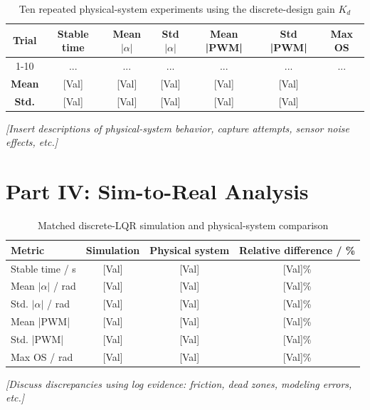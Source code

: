 \documentclass[12pt,a4paper]{article}
\begin{document}
\begin{table}[h!]
    \centering
    \caption{Ten repeated physical-system experiments using the discrete-design gain $K_d$}
    \begin{tabular}{ccccccc}
        \toprule
        \textbf{Trial} & \textbf{Stable time} & \textbf{Mean $|\alpha|$} & \textbf{Std $|\alpha|$} & \textbf{Mean |PWM|} & \textbf{Std |PWM|} & \textbf{Max OS} \\
        \midrule
        1-10 & ... & ... & ... & ... & ... & ... \\
        \midrule
        \textbf{Mean} & [Val] & [Val] & [Val] & [Val] & [Val] & \\
        \textbf{Std.} & [Val] & [Val] & [Val] & [Val] & [Val] & \\
        \bottomrule
    \end{tabular}
\end{table}

\textit{[Insert descriptions of physical-system behavior, capture attempts, sensor noise effects, etc.]}

\section{Part IV: Sim-to-Real Analysis}

\begin{table}[h!]
    \centering
    \caption{Matched discrete-LQR simulation and physical-system comparison}
    \begin{tabular}{lccc}
        \toprule
        \textbf{Metric} & \textbf{Simulation} & \textbf{Physical system} & \textbf{Relative difference / \%} \\
        \midrule
        Stable time / s & [Val] & [Val] & [Val]\% \\
        Mean $|\alpha|$ / rad & [Val] & [Val] & [Val]\% \\
        Std. $|\alpha|$ / rad & [Val] & [Val] & [Val]\% \\
        Mean |PWM| & [Val] & [Val] & [Val]\% \\
        Std. |PWM| & [Val] & [Val] & [Val]\% \\
        Max OS / rad & [Val] & [Val] & [Val]\% \\
        \bottomrule
    \end{tabular}
\end{table}

\textit{[Discuss discrepancies using log evidence: friction, dead zones, modeling errors, etc.]}
\end{document}

